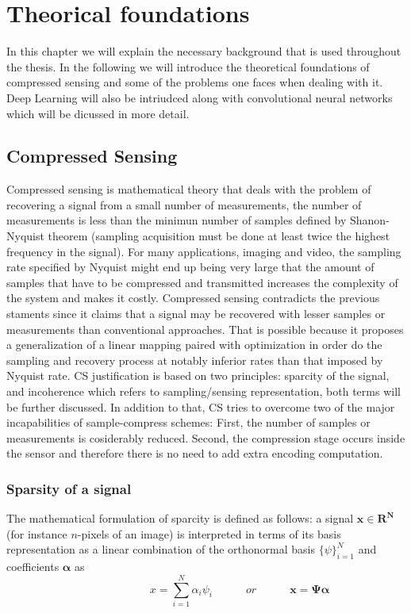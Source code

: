 \chapter{Theorical foundations}
In this chapter we will explain the necessary background that is used throughout the thesis. In the following we will introduce the theoretical foundations of compressed sensing and some of the problems one faces when dealing with it. Deep Learning will also be intriudced along with convolutional neural networks which will be dicussed in more detail.  

\section{Compressed Sensing}

Compressed sensing is mathematical theory that deals with the problem of recovering a signal from a small number of measurements, the number of measurements is less than the minimun number of samples defined by Shanon-Nyquist theorem (sampling acquisition must be done at least twice the highest frequency in the signal). For many applications, imaging and video, the sampling rate specified by Nyquist might end up being very large that the amount of samples that have to be compressed and transmitted increases the complexity of the system and makes it costly. Compressed sensing contradicts the previous staments since it claims that a signal may be recovered with lesser samples or measurements than conventional approaches. That is possible because it proposes a generalization of a linear mapping paired with optimization in order do the sampling and recovery process at notably inferior rates than that imposed by Nyquist rate. CS justification is based on two principles: sparcity of the signal, and incoherence which refers to sampling/sensing representation, both terms will be further discussed. In addition to that, CS tries to overcome two of the major incapabilities of sample-compress schemes: First, the number of samples or measurements is cosiderably reduced. Second, the compression stage occurs inside the sensor and therefore there is no need to add extra encoding computation.

\subsection{Sparsity of a signal}
The mathematical formulation of sparcity is defined as follows: a signal $\mathbf{x \in R^N}$ (for instance $n$-pixels of an image) is interpreted in terms of its basis representation as a linear combination of the orthonormal basis $\{\psi\}_{i=1}^{N}$ and coefficients $\mathbf{\alpha}$ as  
\begin{equation} \label{eq:signal}
\hspace{3em} \hspace{3em} x = \sum\limits_{i=1}^N \alpha_{i} \psi_{i} \hspace{3em} or \hspace{3em} \mathbf{x = \Psi \alpha}
\end{equation} 

